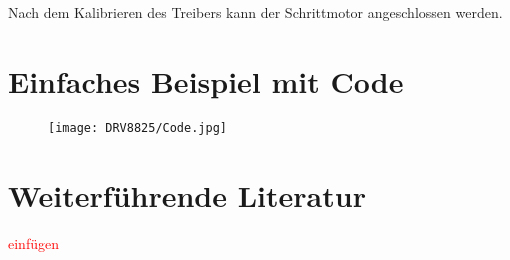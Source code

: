 Nach dem Kalibrieren des Treibers kann der Schrittmotor angeschlossen werden. 
 

\section{Einfaches Beispiel mit Code}

\begin{figure}[htpb]
	\centering
	\texttt{[image: DRV8825/Code.jpg]}
	\label{fig:BeispielCodeDRV8825}
\end{figure}

\section{Weiterführende Literatur}

\textcolor{red}{einfügen}

